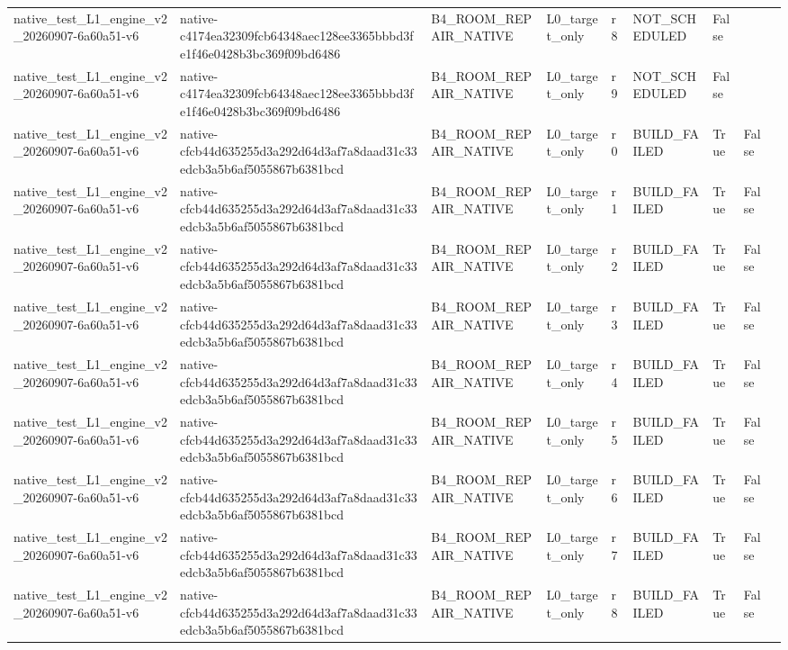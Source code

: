 \begin{tabular}{lllllllll}
native\_test\_L1\_engine\_v2\_20260907-6a60a51-v6 & native-c4174ea32309fcb64348aec128ee3365bbbd3fe1f46e0428b3bc369f09bd6486 & B4\_ROOM\_REPAIR\_NATIVE & L0\_target\_only & r8 & NOT\_SCHEDULED & False &  &  \\
native\_test\_L1\_engine\_v2\_20260907-6a60a51-v6 & native-c4174ea32309fcb64348aec128ee3365bbbd3fe1f46e0428b3bc369f09bd6486 & B4\_ROOM\_REPAIR\_NATIVE & L0\_target\_only & r9 & NOT\_SCHEDULED & False &  &  \\
native\_test\_L1\_engine\_v2\_20260907-6a60a51-v6 & native-cfcb44d635255d3a292d64d3af7a8daad31c33edcb3a5b6af5055867b6381bcd & B4\_ROOM\_REPAIR\_NATIVE & L0\_target\_only & r0 & BUILD\_FAILED & True & False &  \\
native\_test\_L1\_engine\_v2\_20260907-6a60a51-v6 & native-cfcb44d635255d3a292d64d3af7a8daad31c33edcb3a5b6af5055867b6381bcd & B4\_ROOM\_REPAIR\_NATIVE & L0\_target\_only & r1 & BUILD\_FAILED & True & False &  \\
native\_test\_L1\_engine\_v2\_20260907-6a60a51-v6 & native-cfcb44d635255d3a292d64d3af7a8daad31c33edcb3a5b6af5055867b6381bcd & B4\_ROOM\_REPAIR\_NATIVE & L0\_target\_only & r2 & BUILD\_FAILED & True & False &  \\
native\_test\_L1\_engine\_v2\_20260907-6a60a51-v6 & native-cfcb44d635255d3a292d64d3af7a8daad31c33edcb3a5b6af5055867b6381bcd & B4\_ROOM\_REPAIR\_NATIVE & L0\_target\_only & r3 & BUILD\_FAILED & True & False &  \\
native\_test\_L1\_engine\_v2\_20260907-6a60a51-v6 & native-cfcb44d635255d3a292d64d3af7a8daad31c33edcb3a5b6af5055867b6381bcd & B4\_ROOM\_REPAIR\_NATIVE & L0\_target\_only & r4 & BUILD\_FAILED & True & False &  \\
native\_test\_L1\_engine\_v2\_20260907-6a60a51-v6 & native-cfcb44d635255d3a292d64d3af7a8daad31c33edcb3a5b6af5055867b6381bcd & B4\_ROOM\_REPAIR\_NATIVE & L0\_target\_only & r5 & BUILD\_FAILED & True & False &  \\
native\_test\_L1\_engine\_v2\_20260907-6a60a51-v6 & native-cfcb44d635255d3a292d64d3af7a8daad31c33edcb3a5b6af5055867b6381bcd & B4\_ROOM\_REPAIR\_NATIVE & L0\_target\_only & r6 & BUILD\_FAILED & True & False &  \\
native\_test\_L1\_engine\_v2\_20260907-6a60a51-v6 & native-cfcb44d635255d3a292d64d3af7a8daad31c33edcb3a5b6af5055867b6381bcd & B4\_ROOM\_REPAIR\_NATIVE & L0\_target\_only & r7 & BUILD\_FAILED & True & False &  \\
native\_test\_L1\_engine\_v2\_20260907-6a60a51-v6 & native-cfcb44d635255d3a292d64d3af7a8daad31c33edcb3a5b6af5055867b6381bcd & B4\_ROOM\_REPAIR\_NATIVE & L0\_target\_only & r8 & BUILD\_FAILED & True & False &  \\

\end{tabular}
